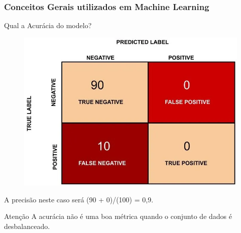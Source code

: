 \documentclass{beamer}
\begin{document}
\begin{frame}
	\frametitle{Conceitos Gerais utilizados em Machine Learning}
	\begin{block}{Qual a Acurácia do modelo?}
		\begin{figure}
			\centering
			\includegraphics[width=0.4\linewidth]{figures/acc_mc1}
		\end{figure}
		A precisão neste caso será (90 + 0)/(100) = 0,9.
	\end{block}
	\begin{alertblock}{Atenção}
		A acurácia não é uma boa métrica quando o conjunto de dados é desbalanceado.
	\end{alertblock}
\end{frame}
\end{document}
